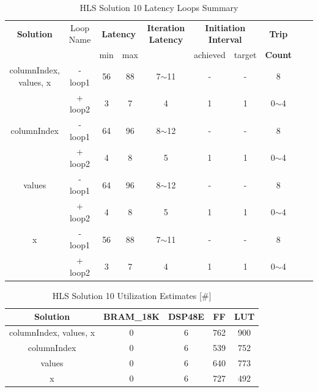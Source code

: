 \begin{table}[H]
	\centering
	\begin{tabular}{|c|c|c|c|c|c|c|c|c|c|}
		\hline
		\multicolumn{1}{|c|}{\textbf{Solution}} & \multicolumn{1}{|c|}{Loop Name} & \multicolumn{2}{|c|}{\textbf{Latency}} & \multicolumn{1}{c|}{\textbf{Iteration Latency}} & \multicolumn{2}{c|}{\textbf{Initiation Interval}} & \multicolumn{1}{c|}{\textbf{Trip}}  \\
		&  & min & max & & achieved & target & \textbf{Count} \\
		\hline
		columnIndex, values, x & - loop1 & 56 & 88 & 7$\sim$11 & - & - & 8 \\
		& + loop2 & 3 & 7 & 4 & 1 & 1 & 0$\sim$4 \\
		\hline
		columnIndex & - loop1 & 64 & 96 & 8$\sim$12 & - & - & 8 \\
		& + loop2 & 4 & 8 & 5 & 1 & 1 & 0$\sim$4 \\
		\hline
		values & - loop1 & 64 & 96 & 8$\sim$12 & - & - & 8 \\
		& + loop2 & 4 & 8 & 5 & 1 & 1 & 0$\sim$4 \\
		\hline
		x & - loop1 & 56 & 88 & 7$\sim$11 & - & - & 8 \\
		& + loop2 & 3 & 7 & 4 & 1 & 1 & 0$\sim$4 \\
		\hline
	\end{tabular}
	\caption{HLS Solution 10 Latency Loops Summary }
	\label{tab:hls-solution-10-loop-summary}
\end{table}

\begin{table}[H]
	\centering
	\begin{tabular}{|c|c|c|c|c|}
		\hline
		\textbf{Solution} & \textbf{BRAM\_18K} & \textbf{DSP48E} & \textbf{FF} & \textbf{LUT} \\
		\hline
		columnIndex, values, x & 0 & 6 & 762 & 900 \\
		\hline
		columnIndex & 0 & 6 & 539 & 752 \\
		\hline
		values & 0 & 6 & 640 & 773 \\
		\hline
		x & 0 & 6 & 727 & 492 \\
		\hline
	\end{tabular}
	\caption{HLS Solution 10 Utilization Estimates [\#]}
	\label{tab:hls-solution-10-utilization-report}
\end{table}


